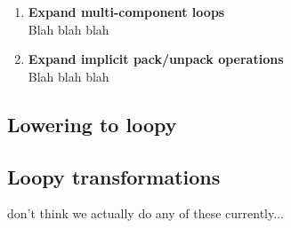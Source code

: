 \documentclass[thesis]{subfiles}
\begin{document}
\begin{enumerate}
  \item
    \textbf{Expand multi-component loops} \\
    Blah blah blah
  \item
    \textbf{Expand implicit pack/unpack operations} \\
    Blah blah blah
\end{enumerate}



\subsection{Lowering to loopy}

\subsection{Loopy transformations}

don't think we actually do any of these currently...

%
%
%
\end{document}

